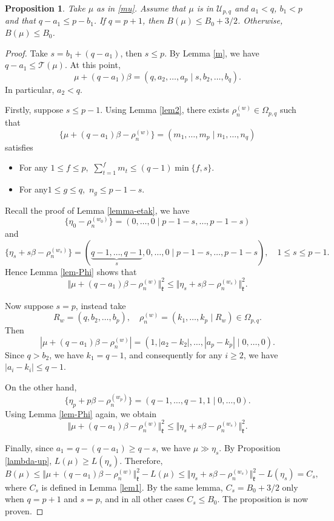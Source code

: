 \documentclass[11pt]{amsart}
\theoremstyle{plain}
\newtheorem{prop}[thm]{Proposition}
\theoremstyle{definition}
\newcommand{\frk}{\mathfrak{k}}
\newcommand{\caT}{\mathcal{T}}
\newcommand{\caU}{\mathcal{U}}
\begin{document}
\begin{prop}
Take $\mu$ as in \eqref{mu}.	Assume that $\mu$ is in $\caU_{p,q}$ and $a_1<q$, $b_1<p$ and that $q-a_1\le p-b_1$. If $q=p+1$, then $B(\mu)\le B_0+3/2$. Otherwise, $B(\mu)\le B_0$.
\end{prop}
\begin{proof}
	Take $s=b_1+(q-a_1)$, then $s\le p$. By Lemma \ref{m}, we have $q-a_1\le \caT(\mu)$. At this point,
	\[\mu+(q-a_1)\beta=(q,a_2,\dots,a_p\mid s,b_2,\dots,b_q).\]
	In particular, $a_2<q$.
	
	Firstly, suppose $s\le p-1$. Using Lemma \ref{lem2}, there exists $\rho_n^{(w)}\in\Omega_{p,q}$ such that
\[\{\mu+(q-a_1)\beta-\rho_n^{(w)}\}=(m_1,\dots,m_p\mid n_1,\dots,n_q)\]
	satisfies
	\begin{itemize}
		\item[(a)] For any $1\le f\le p$,\ $\sum_{t=1}^f m_t\le (q-1)\min\{f,s\}$.
		\item[(b)] For any$1\le g\le q$,\ $n_g\le p-1-s$.
	\end{itemize}
	
	Recall the proof of Lemma \ref{lemma-etak}, we have
	\[\{\eta_0-\rho_n^{(w_0)}\}=(0,\dots,0\mid p-1-s,\dots,p-1-s)\]
	and
		\[\{\eta_s+s\beta-\rho_n^{(w_s)}\}=
		(\underbrace{q-1,\dots,q-1}_{s},0,\dots,0\mid p-1-s,\dots,p-1-s),  \quad 1\le s\le p-1.\]
	Hence Lemma \ref{lem-Phi} shows that
	\[\Vert \mu+(q-a_1)\beta-\rho_n^{(w)}\Vert_\frk^2\le \Vert\eta_s+s\beta-\rho_n^{(w_s)}\Vert_\frk^2.\]
	
	Now suppose $s=p$, instead take
	\[R_w=(q,b_2,\dots,b_p),\quad \rho_n^{(w)}=(k_1,\dots,k_p\mid R_w)\in\Omega_{p,q}.\]
	Then
	\[|\mu+(q-a_1)\beta-\rho_n^{(w)}|=(1,|a_2-k_2|,\dots,|a_p-k_p|\mid 0,\dots,0).\]
	Since $q>b_2$, we have $k_1=q-1$, and consequently for any $i\ge 2$, we have $|a_i-k_i|\le q-1$.
	
	On the other hand,
	\[\{\eta_p+p\beta-\rho_n^{(w_p)}\}=(q-1,\dots,q-1,1\mid 0,\dots,0).\]
	Using Lemma \ref{lem-Phi} again, we obtain
		\[\Vert \mu+(q-a_1)\beta-\rho_n^{(w)}\Vert_\frk^2\le \Vert\eta_s+s\beta-\rho_n^{(w_s)}\Vert_\frk^2.\]
	
	Finally, since $a_1=q-(q-a_1)\ge q-s$, we have $\mu\gg\eta_s$. By Proposition \ref{lambda-up}, $L(\mu)\ge L(\eta_s)$. Therefore,
		\[B(\mu)\le\Vert \mu+(q-a_1)\beta-\rho_n^{(w)}\Vert_\frk^2-L(\mu)\le \Vert\eta_s+s\beta-\rho_n^{(w_s)}\Vert_\frk^2-L(\eta_s)=C_s,\]
where $C_s$ is defined in Lemma \ref{lem1}. By the same lemma, $C_s=B_0+3/2$ only when $q=p+1$ and $s=p$, and in all other cases $C_s\le B_0$. The proposition is now proven.
\end{proof}
\end{document}
